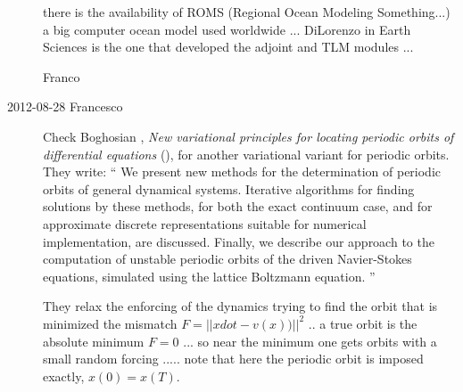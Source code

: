 \begin{description}
there is the availability of ROMS (Regional Ocean Modeling Something...)
a big computer ocean model used worldwide ... DiLorenzo in Earth Sciences
is the one that developed the adjoint and TLM modules ...

Franco

\item[2012-08-28 Francesco] Check Boghosian \etal{}, \emph{New
variational principles for locating periodic orbits of differential
equations} (),
for  another variational variant for periodic orbits. They write: ``
We present new methods for the determination of periodic
orbits of general dynamical systems. Iterative algorithms for finding
solutions by these methods, for both the exact continuum case, and for
approximate discrete representations suitable for numerical
implementation, are discussed. Finally, we describe our approach to the
computation of unstable periodic orbits of the driven Navier-Stokes
equations, simulated using the lattice Boltzmann equation.
''

They relax the enforcing of the dynamics trying to find the orbit that is
minimized the mismatch $F=||xdot-v(x))||^2$ .. a true orbit is the
absolute minimum $F=0$ ... so near the minimum one gets orbits with a
small random forcing ..... note that here the periodic orbit is imposed
exactly, $x(0)=x(T)$.


\end{description}
